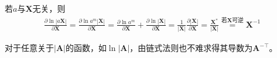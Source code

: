\documentclass{ctexart}
\theoremstyle{definition}
\def \Av {\mathbf{A}}
\def \Xv {\mathbf{X}}
\begin{document}
若$a$与$\Xv$无关，则
\begin{align*}
    \frac{\partial \ln |a \Xv|}{\partial \Xv} = \frac{\partial \ln a^m |\Xv|}{\partial \Xv} = \frac{\partial \ln a^m}{\partial \Xv} + \frac{\partial \ln |\Xv|}{\partial \Xv} = \frac{1}{|\Xv|} \frac{\partial |\Xv|}{\partial \Xv} = \frac{\Xv^*}{|\Xv|} \overset{\text{若}\Xv\text{可逆}}{=} \Xv^{-1}
\end{align*}

对于任意关于$|\Av|$的函数，如$\ln |\Av|$，由链式法则也不难求得其导数为$\Av^{-\top}$。
\end{document}
